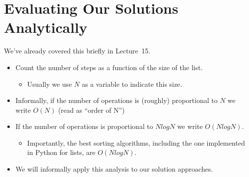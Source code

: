 \documentclass[letterpaper,10pt,english]{sphinxmanual}
\begin{document}
\section{Evaluating Our Solutions Analytically}
\label{\detokenize{lecture_notes/lec20_searching:evaluating-our-solutions-analytically}}
We’ve already covered this briefly in Lecture 15.
\begin{itemize}
\item {} 
Count the number of steps as a function of the size of the list.
\begin{itemize}
\item {} 
Usually we use \(N\) as a variable to indicate this size.

\end{itemize}

\item {} 
Informally, if the number of operations is (roughly) proportional to
\(N\) we write \(O(N)\) (read as “order of N”)

\item {} 
If the number of operations is proportional to \(N log N\) we
write \(O(N log N)\).
\begin{itemize}
\item {} 
Importantly, the best sorting algorithms, including the one
implemented in Python for lists, are \(O(N log N)\).

\end{itemize}

\item {} 
We will informally apply this analysis to our solution approaches.

\end{itemize}
\end{document}
